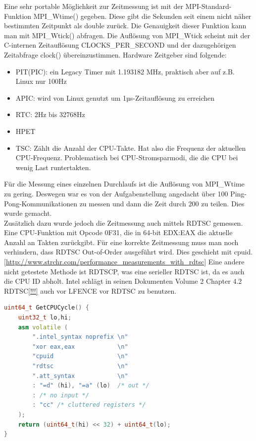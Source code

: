\documentclass[12pt,a4paper]{article}
\begin{document}

Eine sehr portable Möglichkeit zur Zeitmessung ist mit der MPI-Standard-Funktion MPI\_Wtime() gegeben. Diese gibt die Sekunden seit einem nicht näher bestimmten Zeitpunkt als double zurück. Die Genauigkeit dieser Funktion kann man mit MPI\_Wtick() abfragen.
Die Auflösung von MPI\_Wtick scheint mit der C-internen Zeitauflösung CLOCKS\_PER\_SECOND und der dazugehörigen Zeitabfrage clock() übereinzustimmen. Hardware Zeitgeber sind folgende: 
\begin{itemize}
	\item PIT(PIC): ein Legacy Timer mit 1.193182 MHz, praktisch aber auf z.B. Linux nur 100Hz
	\item APIC: wird von Linux genutzt um 1µs-Zeitauflösung zu erreichen
	\item RTC: 2Hz bis 32768Hz
	\item HPET
	\item TSC: Zählt die Anzahl der CPU-Takte. Hat also die Frequenz der aktuellen CPU-Frequenz. Problematisch bei CPU-Stromsparmodi, die die CPU bei wenig Last runtertakten.
\end{itemize}

Für die Messung eines einzelnen Durchlaufs ist die Auflösung von MPI\_Wtime zu gering. Deswegen war es von der Aufgabenstellung angedacht über 100 Ping-Pong-Kommunikationen zu messen und dann die Zeit durch 200 zu teilen. Dies wurde gemacht.\\

Zusätzlich dazu wurde jedoch die Zeitmessung auch mittels RDTSC gemessen. Eine CPU-Funktion mit Opcode 0F31, die in 64-bit EDX:EAX die aktuelle Anzahl an Takten zurückgibt. Für eine korrekte Zeitmessung muss man noch verhindern, dass RDTSC Out-of-Order ausgeführt wird. Dies geschieht mit cpuid. \ref{http://www.strchr.com/performance_measurements_with_rdtsc} Eine andere nicht getestete Methode ist RDTSCP, was eine serieller RDTSC ist, da es auch die CPU ID abholt. Intel schlägt in seinen Dokumenten Volume 2 Chapter 4.2 RDTSC\ref{!!!} auch vor LFENCE vor RDTSC zu benutzen.\\

\begin{center}\begin{minipage}{0.75\linewidth}\begin{lstlisting}[language=C++]
uint64_t GetCPUCycle() {
    uint32_t lo,hi;
    asm volatile (
        ".intel_syntax noprefix \n"
        "xor eax,eax            \n"
        "cpuid                  \n"
        "rdtsc                  \n"
        ".att_syntax            \n"
        : "=d" (hi), "=a" (lo)  /* out */
        : /* no input */
        : "cc" /* cluttered registers */
    );
    return (uint64_t(hi) << 32) + uint64_t(lo);
}
\end{lstlisting}\end{minipage}
\end{center}
\end{document}
